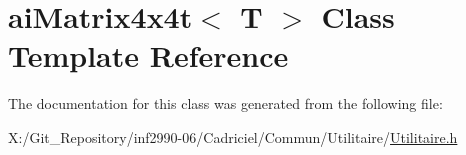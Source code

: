 \hypertarget{classai_matrix4x4t}{\section{ai\-Matrix4x4t$<$ T $>$ Class Template Reference}
\label{classai_matrix4x4t}
}


The documentation for this class was generated from the following file\-:\begin{DoxyCompactItemize}
\item 
X\-:/\-Git\-\_\-\-Repository/inf2990-\/06/\-Cadriciel/\-Commun/\-Utilitaire/\hyperlink{_utilitaire_8h}{Utilitaire.\-h}\end{DoxyCompactItemize}

